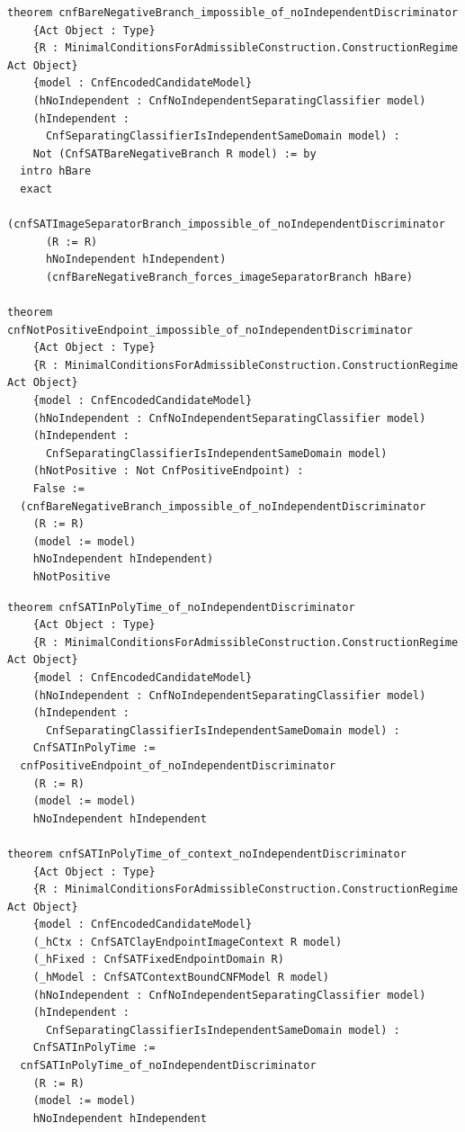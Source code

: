 \documentclass[11pt]{article}
\theoremstyle{definition}
\theoremstyle{remark}
\begin{document}
\begin{lstlisting}[basicstyle=\ttfamily\scriptsize]
theorem cnfBareNegativeBranch_impossible_of_noIndependentDiscriminator
    {Act Object : Type}
    {R : MinimalConditionsForAdmissibleConstruction.ConstructionRegime Act Object}
    {model : CnfEncodedCandidateModel}
    (hNoIndependent : CnfNoIndependentSeparatingClassifier model)
    (hIndependent :
      CnfSeparatingClassifierIsIndependentSameDomain model) :
    Not (CnfSATBareNegativeBranch R model) := by
  intro hBare
  exact
    (cnfSATImageSeparatorBranch_impossible_of_noIndependentDiscriminator
      (R := R)
      hNoIndependent hIndependent)
      (cnfBareNegativeBranch_forces_imageSeparatorBranch hBare)

theorem cnfNotPositiveEndpoint_impossible_of_noIndependentDiscriminator
    {Act Object : Type}
    {R : MinimalConditionsForAdmissibleConstruction.ConstructionRegime Act Object}
    {model : CnfEncodedCandidateModel}
    (hNoIndependent : CnfNoIndependentSeparatingClassifier model)
    (hIndependent :
      CnfSeparatingClassifierIsIndependentSameDomain model)
    (hNotPositive : Not CnfPositiveEndpoint) :
    False :=
  (cnfBareNegativeBranch_impossible_of_noIndependentDiscriminator
    (R := R)
    (model := model)
    hNoIndependent hIndependent)
    hNotPositive
\end{lstlisting}

\begin{lstlisting}[basicstyle=\ttfamily\scriptsize]
theorem cnfSATInPolyTime_of_noIndependentDiscriminator
    {Act Object : Type}
    {R : MinimalConditionsForAdmissibleConstruction.ConstructionRegime Act Object}
    {model : CnfEncodedCandidateModel}
    (hNoIndependent : CnfNoIndependentSeparatingClassifier model)
    (hIndependent :
      CnfSeparatingClassifierIsIndependentSameDomain model) :
    CnfSATInPolyTime :=
  cnfPositiveEndpoint_of_noIndependentDiscriminator
    (R := R)
    (model := model)
    hNoIndependent hIndependent

theorem cnfSATInPolyTime_of_context_noIndependentDiscriminator
    {Act Object : Type}
    {R : MinimalConditionsForAdmissibleConstruction.ConstructionRegime Act Object}
    {model : CnfEncodedCandidateModel}
    (_hCtx : CnfSATClayEndpointImageContext R model)
    (_hFixed : CnfSATFixedEndpointDomain R)
    (_hModel : CnfSATContextBoundCNFModel R model)
    (hNoIndependent : CnfNoIndependentSeparatingClassifier model)
    (hIndependent :
      CnfSeparatingClassifierIsIndependentSameDomain model) :
    CnfSATInPolyTime :=
  cnfSATInPolyTime_of_noIndependentDiscriminator
    (R := R)
    (model := model)
    hNoIndependent hIndependent
\end{lstlisting}
\end{document}
